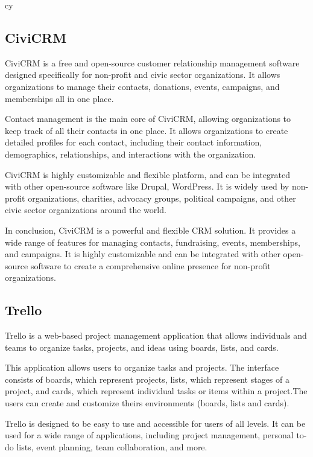 cy\documentclass{article}
\begin{document}
\subsection{CiviCRM}

 CiviCRM is a free and open-source customer relationship management software designed specifically for non-profit and civic sector organizations. It allows organizations to manage their contacts, donations, events, campaigns, and memberships all in one place. 
 
 Contact management is the main core of CiviCRM, allowing organizations to keep track of all their contacts in one place. It allows organizations to create detailed profiles for each contact, including their contact information, demographics, relationships, and interactions with the organization.

 CiviCRM is highly customizable and flexible platform, and can be integrated with other open-source software like Drupal, WordPress. It is widely used by non-profit organizations, charities, advocacy groups, political campaigns, and other civic sector organizations around the world.

 In conclusion, CiviCRM is a powerful and flexible CRM solution. It provides a wide range of features for managing contacts, fundraising, events, memberships, and campaigns. It is highly customizable and can be integrated with other open-source software to create a comprehensive online presence for non-profit organizations.

\subsection{Trello}

Trello is a web-based project management application that allows individuals and teams to organize tasks, projects, and ideas using boards, lists, and cards.

This application  allows users to organize tasks and projects. The interface consists of boards, which represent projects, lists, which represent stages of a project, and cards, which represent individual tasks or items within a project.The users can create and customize theirs environments (boards, lists and cards).

Trello is designed to be easy to use and accessible for users of all levels. It can be used for a wide range of applications, including project management, personal to-do lists, event planning, team collaboration, and more.
\end{document}
